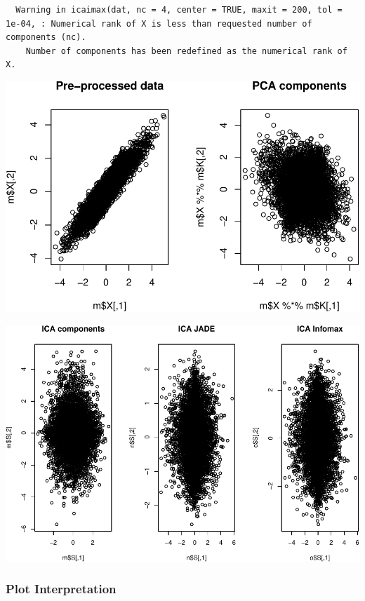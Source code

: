 \documentclass[12pt,twoside]{amherstthesis}
\begin{document}
  \begin{verbatim}
  Warning in icaimax(dat, nc = 4, center = TRUE, maxit = 200, tol = 1e-04, : Numerical rank of X is less than requested number of components (nc).
    Number of components has been redefined as the numerical rank of X.
  \end{verbatim}
  
  \begin{center}\includegraphics{ICA_Stats_Comps_files/figure-latex/unnamed-chunk-2-1} \end{center}
  
  \begin{center}\includegraphics{ICA_Stats_Comps_files/figure-latex/unnamed-chunk-2-2} \end{center}
  
  \subsubsection{Plot Interpretation}\label{plot-interpretation-1}
  
\end{document}
